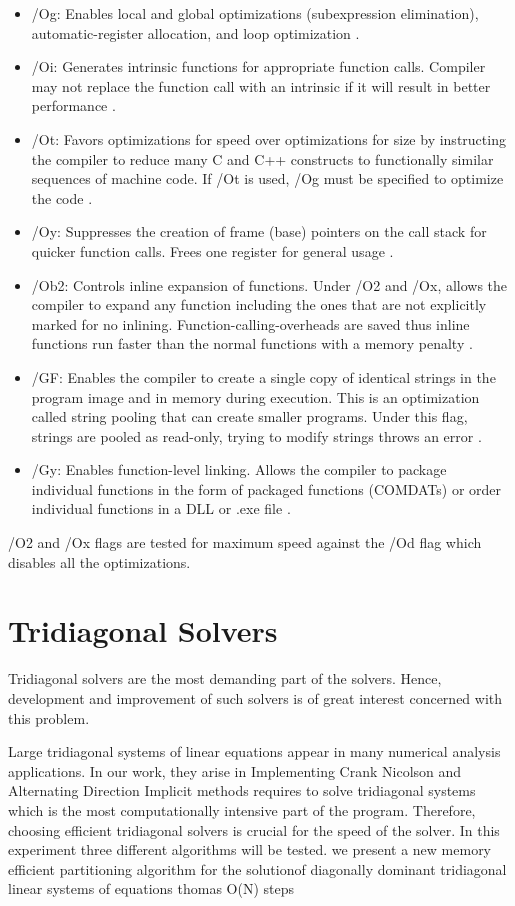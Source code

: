 \documentclass[12pt, oneside]{book}
\theoremstyle{plain}
\theoremstyle{definition}
\begin{document}
\begin{itemize}
\item /Og: Enables local and global optimizations (subexpression elimination), automatic-register allocation, and loop optimization \cite{og}. 
\item /Oi: Generates intrinsic functions for appropriate function calls. Compiler may not replace the function call with an intrinsic if it will result in better performance \cite{oi}.
\item /Ot: Favors optimizations for speed over optimizations for size by instructing the compiler to reduce many C and C++ constructs to functionally similar sequences of machine code. If /Ot is used, /Og must be specified to optimize the code \cite{ot}.
\item /Oy: Suppresses the creation of frame (base) pointers on the call stack for quicker function calls.  Frees one register for general usage \cite{oy}.
\item /Ob2: Controls inline expansion of functions. Under /O2 and /Ox, allows the compiler to expand any function including the ones  that are not explicitly marked for no inlining. Function-calling-overheads are saved thus inline functions run faster than the normal functions with a memory penalty \cite{ob}.
\item /GF:  Enables the compiler to create a single copy of identical strings in the program image and in memory during execution. This is an optimization called string pooling that can create smaller programs. Under this flag, strings are pooled as read-only, trying to modify strings throws an error \cite{gf}.
\item /Gy: Enables function-level linking. Allows the compiler to package individual functions in the form of packaged functions  (COMDATs) or order individual functions in a DLL or .exe file \cite{gy}.
\end{itemize}

/O2 and /Ox flags are tested for maximum speed against the /Od flag which disables all the optimizations.
 
\section{Tridiagonal Solvers}
Tridiagonal solvers are the most demanding part of the solvers. Hence, development and improvement of such solvers is of great interest \cite{terekhov} \cite{chavez} \cite{hofen} \cite{austin} concerned with this problem. 

Large tridiagonal systems of linear equations appear in many numerical analysis applications. In our work, they arise in 
Implementing Crank Nicolson and Alternating Direction Implicit methods requires to solve tridiagonal systems which is the most computationally intensive part of the program.  Therefore, choosing efficient tridiagonal solvers is crucial for the speed of the solver. In this experiment three different algorithms will be tested.
we present a new memory efficient partitioning algorithm for the solutionof diagonally dominant tridiagonal linear systems of equations thomas O(N) steps
\end{document}
